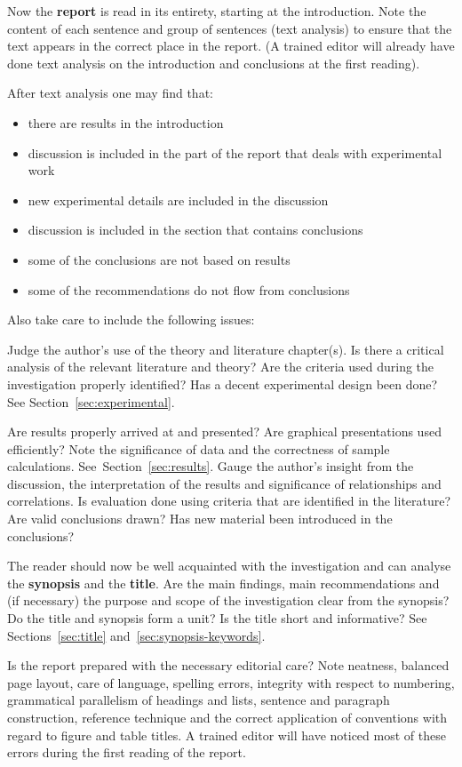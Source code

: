 \documentclass[a5paper, 10pt]{article}
\newcommand{\strongemph}[1]{\textbf{#1}}
\begin{document}
Now the \strongemph{report} is read in its entirety, starting at the
introduction.  Note the content of each sentence and group of
sentences (text analysis) to ensure that the text appears in the
correct place in the report.  (A trained editor will already have done
text analysis on the introduction and conclusions at the first
reading).

After text analysis one may find that:
\begin{itemize}
\item there are results in the introduction
\item discussion is included in the part of the report that deals with
  experimental work
\item new experimental details are included in the discussion
\item discussion is included in the section that contains conclusions
\item some of the conclusions are not based on results
\item some of the recommendations do not flow from conclusions
\end{itemize}

Also take care to include the following issues:

Judge the author's use of the theory and literature chapter(s).  Is
there a critical analysis of the relevant literature and theory?  Are
the criteria used during the investigation properly identified?  Has a
decent experimental design been done?  See
Section~\ref{sec:experimental}.

Are results properly arrived at and presented?  Are graphical
presentations used efficiently?  Note the significance of data and the
correctness of sample calculations.  See~Section~\ref{sec:results}.
Gauge the author's insight from the discussion, the interpretation of
the results and significance of relationships and correlations.  Is
evaluation done using criteria that are identified in the literature?
Are valid conclusions drawn?  Has new material been introduced in the
conclusions?

The reader should now be well acquainted with the investigation and
can analyse the \strongemph{synopsis} and the \strongemph{title}.  Are
the main findings, main recommendations and (if necessary) the purpose
and scope of the investigation clear from the synopsis?  Do the title
and synopsis form a unit?  Is the title short and informative?  See
Sections~\ref{sec:title} and~\ref{sec:synopsis-keywords}.

Is the report prepared with the necessary editorial care?  Note
neatness, balanced page layout, care of language, spelling errors,
integrity with respect to numbering, grammatical parallelism of
headings and lists, sentence and paragraph construction, reference
technique and the correct application of conventions with regard to
figure and table titles.  A trained editor will have noticed most of
these errors during the first reading of the report.
\end{document}
